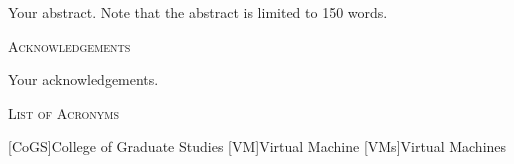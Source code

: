 \documentclass[12pt]{UIdahoMastersThesis}
\begin{document}
Your abstract. Note that the abstract is limited to 150 words.

\newpage


 \begin{center}
 	{\LARGE\textsc{Acknowledgements}}
 \end{center}
 
Your acknowledgements.

\newpage


   
   


\tableofcontents
\newpage








\begin{center}
	{\LARGE\textsc{List of Acronyms}}
\end{center}

\begin{acronym}[CoGS ]  %
    [CoGS]{College of Graduate Studies}
    [VM]{Virtual Machine}  %
    [VMs]{Virtual Machines}  %
\end{acronym}
\end{document}
